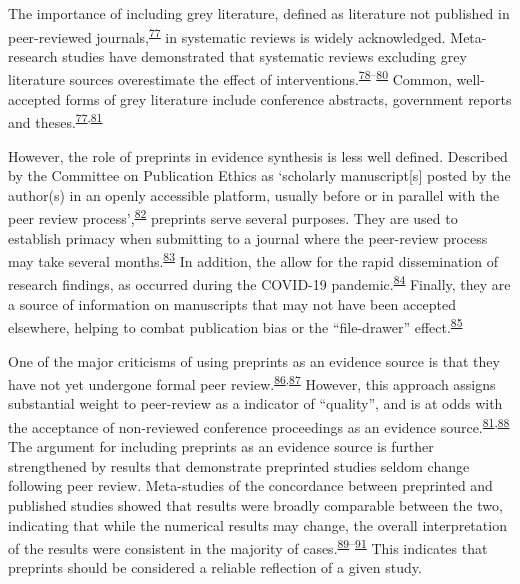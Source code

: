 \documentclass[a4paper, twoside]{templates/ociamthesis}
\begin{document}
The importance of including grey literature, defined as literature not published in peer-reviewed journals,\textsuperscript{\protect\hyperlink{ref-paez2017}{77}} in systematic reviews is widely acknowledged. Meta-research studies have demonstrated that systematic reviews excluding grey literature sources overestimate the effect of interventions.\textsuperscript{\protect\hyperlink{ref-conn2003}{78}--\protect\hyperlink{ref-hopewell2007}{80}} Common, well-accepted forms of grey literature include conference abstracts, government reports and theses.\textsuperscript{\protect\hyperlink{ref-paez2017}{77},\protect\hyperlink{ref-lefebvre2019searching}{81}}

However, the role of preprints in evidence synthesis is less well defined. Described by the Committee on Publication Ethics as `scholarly manuscript{[}s{]} posted by the author(s) in an openly accessible platform, usually before or in parallel with the peer review process',\textsuperscript{\protect\hyperlink{ref-committeeonpublicationethicscope2018}{82}} preprints serve several purposes. They are used to establish primacy when submitting to a journal where the peer-review process may take several months.\textsuperscript{\protect\hyperlink{ref-vale2016}{83}} In addition, the allow for the rapid dissemination of research findings, as occurred during the COVID-19 pandemic.\textsuperscript{\protect\hyperlink{ref-fraser2020preprinting}{84}} Finally, they are a source of information on manuscripts that may not have been accepted elsewhere, helping to combat publication bias or the ``file-drawer'' effect.\textsuperscript{\protect\hyperlink{ref-rosenthal1979}{85}}

One of the major criticisms of using preprints as an evidence source is that they have not yet undergone formal peer review.\textsuperscript{\protect\hyperlink{ref-maslove2018}{86},\protect\hyperlink{ref-schalkwyk2020}{87}} However, this approach assigns substantial weight to peer-review as a indicator of ``quality'', and is at odds with the acceptance of non-reviewed conference proceedings as an evidence source.\textsuperscript{\protect\hyperlink{ref-lefebvre2019searching}{81},\protect\hyperlink{ref-mahood2014}{88}} The argument for including preprints as an evidence source is further strengthened by results that demonstrate preprinted studies seldom change following peer review. Meta-studies of the concordance between preprinted and published studies showed that results were broadly comparable between the two, indicating that while the numerical results may change, the overall interpretation of the results were consistent in the majority of cases.\textsuperscript{\protect\hyperlink{ref-shi2021}{89}--\protect\hyperlink{ref-nicholson2021}{91}} This indicates that preprints should be considered a reliable reflection of a given study.
\end{document}
